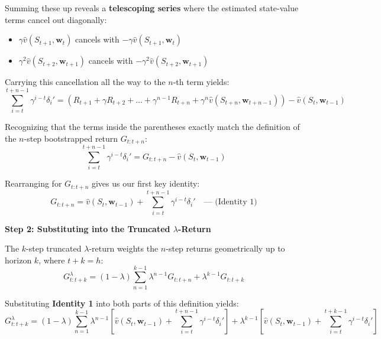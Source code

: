 \documentclass{article}
\begin{document}
Summing these up reveals a \textbf{telescoping series} where the estimated state-value terms cancel out diagonally:
\begin{itemize}
    \item $\gamma \hat{v}(S_{t+1}, \mathbf{w}_t)$ cancels with $-\gamma \hat{v}(S_{t+1}, \mathbf{w}_t)$
    \item $\gamma^2 \hat{v}(S_{t+2}, \mathbf{w}_{t+1})$ cancels with $-\gamma^2 \hat{v}(S_{t+2}, \mathbf{w}_{t+1})$
\end{itemize}

Carrying this cancellation all the way to the $n$-th term yields:
\begin{equation}
\sum_{i=t}^{t+n-1} \gamma^{i-t} \delta_i' = \left( R_{t+1} + \gamma R_{t+2} + \dots + \gamma^{n-1} R_{t+n} + \gamma^n \hat{v}(S_{t+n}, \mathbf{w}_{t+n-1}) \right) - \hat{v}(S_t, \mathbf{w}_{t-1})
\end{equation}

Recognizing that the terms inside the parentheses exactly match the definition of the $n$-step bootstrapped return $G_{t:t+n}$:
\begin{equation}
\sum_{i=t}^{t+n-1} \gamma^{i-t} \delta_i' = G_{t:t+n} - \hat{v}(S_t, \mathbf{w}_{t-1})
\end{equation}

Rearranging for $G_{t:t+n}$ gives us our first key identity:
\begin{equation}
G_{t:t+n} = \hat{v}(S_t, \mathbf{w}_{t-1}) + \sum_{i=t}^{t+n-1} \gamma^{i-t} \delta_i' \quad \text{--- (Identity 1)}
\end{equation}

\textbf{Step 2: Substituting into the Truncated $\lambda$-Return}

The $k$-step truncated $\lambda$-return weights the $n$-step returns geometrically up to horizon $k$, where $t + k = h$:
\begin{equation}
G_{t:t+k}^\lambda = (1-\lambda) \sum_{n=1}^{k-1} \lambda^{n-1} G_{t:t+n} + \lambda^{k-1} G_{t:t+k}
\end{equation}

Substituting \textbf{Identity 1} into both parts of this definition yields:
\begin{equation}
G_{t:t+k}^\lambda = (1-\lambda) \sum_{n=1}^{k-1} \lambda^{n-1} \left[ \hat{v}(S_t, \mathbf{w}_{t-1}) + \sum_{i=t}^{t+n-1} \gamma^{i-t} \delta_i' \right] + \lambda^{k-1} \left[ \hat{v}(S_t, \mathbf{w}_{t-1}) + \sum_{i=t}^{t+k-1} \gamma^{i-t} \delta_i' \right]
\end{equation}
\end{document}
